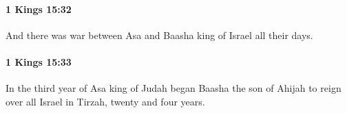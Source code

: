 		\paragraph{1 Kings 15:32} %
			\label{1KINGS-15-32}

			And there was war between Asa and Baasha king of Israel all their days.


		\paragraph{1 Kings 15:33} %
			\label{1KINGS-15-33}

			In the third year of Asa king of Judah began Baasha the son of Ahijah to reign over all Israel in Tirzah, twenty and four years.


